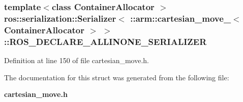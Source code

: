 \subsubsection[{\-R\-O\-S\-\_\-\-D\-E\-C\-L\-A\-R\-E\-\_\-\-A\-L\-L\-I\-N\-O\-N\-E\-\_\-\-S\-E\-R\-I\-A\-L\-I\-Z\-E\-R}]{\setlength{\rightskip}{0pt plus 5cm}template$<$class Container\-Allocator $>$ ros\-::serialization\-::\-Serializer$<$ \-::{\bf arm\-::cartesian\-\_\-move\-\_\-}$<$ \-Container\-Allocator $>$ $>$\-::{\bf \-R\-O\-S\-\_\-\-D\-E\-C\-L\-A\-R\-E\-\_\-\-A\-L\-L\-I\-N\-O\-N\-E\-\_\-\-S\-E\-R\-I\-A\-L\-I\-Z\-E\-R}}\label{structros_1_1serialization_1_1Serializer_3_01_1_1arm_1_1cartesian__move___3_01ContainerAllocator_01_4_01_4_a1c341d5424133877c655c743fd35f0bb}


\-Definition at line 150 of file cartesian\-\_\-move.\-h.



\-The documentation for this struct was generated from the following file\-:\begin{DoxyCompactItemize}
\item 
{\bf cartesian\-\_\-move.\-h}\end{DoxyCompactItemize}

